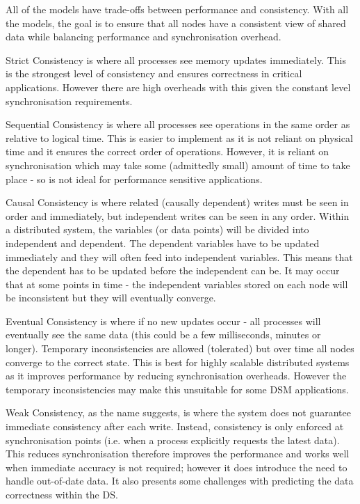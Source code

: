 All of the models have trade-offs between performance and consistency. With all the models, the goal is to ensure that all nodes have a consistent view of shared data while balancing performance and synchronisation overhead. 

Strict Consistency is where all processes see memory updates immediately. This is the strongest level of consistency and ensures correctness in critical applications. However there are high overheads with this given the constant level synchronisation requirements. 

Sequential Consistency is where all processes see operations in the same order as relative to logical time. This is easier to implement as it is not reliant on physical time and it ensures the correct order of operations. However, it is reliant on synchronisation which may take some (admittedly small) amount of time to take place - so is not ideal for performance sensitive applications. 

Causal Consistency is where related (causally dependent) writes must be seen in order and immediately, but independent writes can be seen in any order. Within a distributed system, the variables (or data points) will be divided into independent and dependent. The dependent variables have to be updated immediately and they will often feed into independent variables. This means that the dependent has to be updated before the independent can be. It may occur that at some points in time - the independent variables stored on each node will be inconsistent but they will eventually converge. 

Eventual Consistency is where if no new updates occur - all processes will eventually see the same data (this could be a few milliseconds, minutes or longer). Temporary inconsistencies are allowed (tolerated) but over time all nodes converge to the correct state. This is best for highly scalable distributed systems as it improves performance by reducing synchronisation overheads. However the temporary inconsistencies may make this unsuitable for some DSM applications. 

Weak Consistency, as the name suggests, is where the system does not guarantee immediate consistency after each write. Instead, consistency is only enforced at synchronisation points (i.e. when a process explicitly requests the latest data). This reduces synchronisation therefore improves the performance and works well when immediate accuracy is not required; however it does introduce the need to handle out-of-date data. It also presents some challenges with predicting the data correctness within the DS. 

